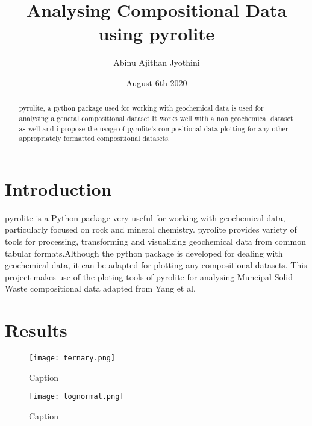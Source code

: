 \documentclass{article}
\title{Analysing Compositional Data using pyrolite }
\author{Abinu Ajithan Jyothini}
\date{August 6th 2020}
\begin{document}
\maketitle

\begin{abstract}
pyrolite, a python package used for working with geochemical data is used for analysing a general compositional dataset.It works well with a non geochemical dataset as well and i propose the usage of pyrolite's compositional data plotting for any other appropriately formatted compositional datasets. 
\end{abstract}

\section{Introduction}

pyrolite is a Python package very useful for  working with geochemical data, particularly focused on rock and mineral chemistry. pyrolite provides variety of tools for processing, transforming and visualizing geochemical data from common tabular formats.Although the python package is developed for dealing with geochemical data, it can be adapted for plotting any compositional datasets. This project makes use of the ploting tools of pyrolite for analysing Muncipal Solid Waste compositional data adapted from Yang et al\cite{yang2018comparison}.

\section{Results}
\begin{figure}
    \centering
    \texttt{[image: ternary.png]}
    \caption{Caption}
    \label{ternary}
\end{figure}

\begin{figure}
    \centering
    \texttt{[image: lognormal.png]}
    \caption{Caption}
    \label{ternary}
\end{figure}



 

\end{document}
